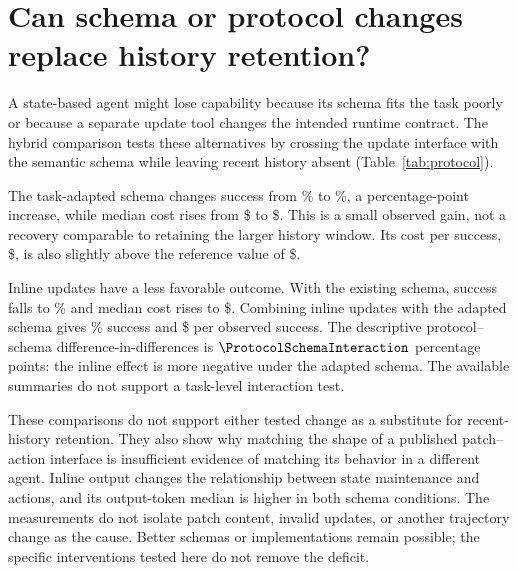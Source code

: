 \section{Can schema or protocol changes replace history retention?}
\label{sec:protocol}

A state-based agent might lose capability because its schema fits the task
poorly or because a separate update tool changes the intended runtime
contract. The hybrid comparison tests these alternatives by crossing
the update interface with the semantic schema while leaving recent
history absent (Table~\ref{tab:protocol}).

\begin{table}[htbp]
\centering\small
\caption{Update protocol and schema within hybrid state, in the same two
panels as Table~\ref{tab:composition}. Hybrid aggregates cannot
reconstruct matched cost ratios, peak prompt, or cache hit (--).}
\label{tab:protocol}
\resizebox{\linewidth}{!}{}

\medskip
\resizebox{\linewidth}{!}{}
\end{table}

The task-adapted schema changes success from \HybridRate\% to
\TaskAdaptedRate\%, a \TaskAdaptedVsHybridDelta{} percentage-point
increase, while median cost rises from \$\HybridCostMedian{} to
\$\TaskAdaptedCostMedian{}. This is a small observed gain, not a recovery
comparable to retaining the larger history window. Its cost per success,
\$\TaskAdaptedCostPerSuccess{}, is also slightly above the reference
value of \$\HybridCostPerSuccess{}.

Inline updates have a less favorable outcome. With the existing schema,
success falls to \InlineRate\% and median cost rises to
\$\InlineCostMedian{}. Combining inline updates with the adapted schema
gives \InlineAdaptedRate\% success and
\$\InlineAdaptedCostPerSuccess{} per observed success.
The descriptive protocol--schema difference-in-differences is
$\ProtocolSchemaInteraction$ percentage points: the inline effect is
more negative under the adapted schema. The available summaries do not
support a task-level interaction test.

These comparisons do not support either tested change as a substitute for
recent-history retention. They also show why matching the shape of a
published patch--action interface is insufficient evidence of matching its
behavior in a different agent. Inline output changes the relationship
between state maintenance and actions, and its output-token median is
higher in both schema conditions. The measurements do not isolate patch
content, invalid updates, or another trajectory change as the cause.
Better schemas or implementations remain possible; the specific
interventions tested here do not remove the deficit.
